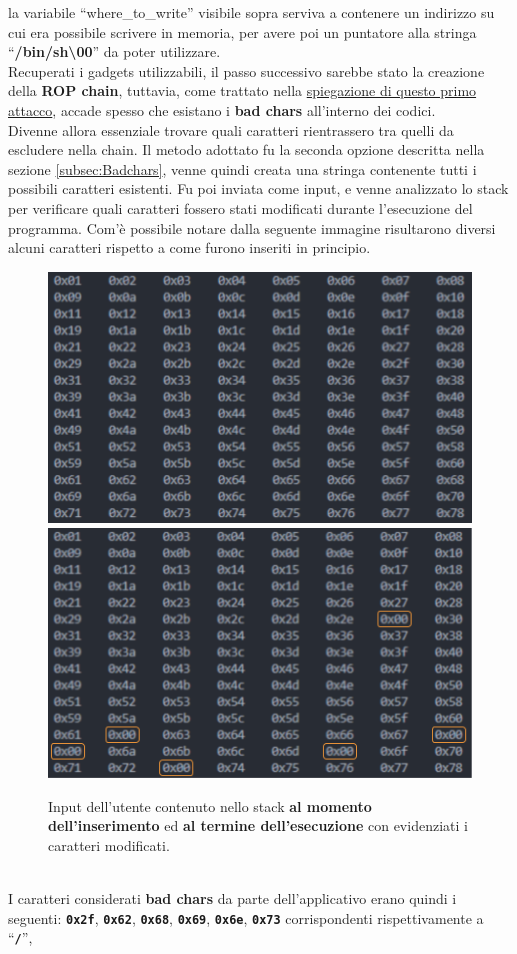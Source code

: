 la variabile ``where\_to\_write'' visibile sopra serviva a contenere un indirizzo su cui era possibile scrivere in memoria, per avere poi un puntatore alla stringa ``\textbf{/bin/sh\textbackslash00}'' da poter utilizzare.\\
Recuperati i gadgets utilizzabili, il passo successivo sarebbe stato la creazione della \textbf{ROP chain}, tuttavia, come trattato nella \hyperref[sec:Attack_1]{spiegazione di questo primo attacco}, accade spesso che esistano 
i \textbf{bad chars} all'interno dei codici.\\
Divenne allora essenziale trovare quali caratteri rientrassero tra quelli da escludere nella chain. Il metodo adottato fu la seconda opzione descritta nella sezione \ref*{subsec:Badchars}, venne quindi creata una stringa contenente tutti i 
possibili caratteri esistenti. Fu poi inviata come input, e venne analizzato lo stack per verificare quali caratteri fossero stati modificati durante l'esecuzione del programma. Com'è possibile notare dalla seguente immagine risultarono diversi 
alcuni caratteri rispetto a come furono inseriti in principio.
\begin{figure}
      \centering
      \includegraphics[width=.48\textwidth]{images/bad-pre.png}\hfil
      \includegraphics[width=.48\textwidth]{images/bad-act.png}
      \caption{Input dell'utente contenuto nello stack \textbf{al momento dell'inserimento} ed \textbf{al termine dell'esecuzione} con evidenziati i caratteri modificati.}\label{fig:badchars}
\end{figure}
\\I caratteri considerati \textbf{bad chars} da parte dell'applicativo erano quindi i seguenti: \texttt{\textbf{0x2f}}, \texttt{\textbf{0x62}}, \texttt{\textbf{0x68}}, \texttt{\textbf{0x69}}, \texttt{\textbf{0x6e}}, \texttt{\textbf{0x73}} corrispondenti rispettivamente a ``\texttt{\textbf{/}}'', 
